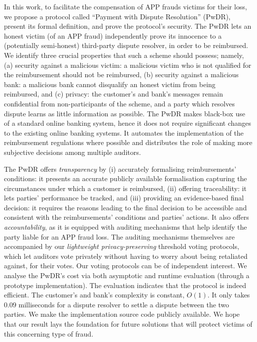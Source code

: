  In this work, to facilitate the compensation of   APP frauds victims for their loss, we propose a protocol called ``Payment with Dispute Resolution'' (PwDR), present its formal definition,  and prove the protocol's security.  The PwDR lets an honest victim (of an APP fraud)  independently prove its innocence to a  (potentially semi-honest) third-party dispute resolver, in order to be reimbursed.  We identify three crucial properties that such a scheme should possess; namely, (a) security against a malicious victim: a malicious victim who is not qualified for the reimbursement should not be reimbursed, (b) security against a malicious bank: a malicious bank cannot disqualify an honest victim from being reimbursed, and (c) privacy: the customer’s and bank’s messages remain confidential from non-participants of the scheme, and a party which resolves dispute learns as little information as possible.  The PwDR makes black-box use of a standard online banking system, hence it does not require significant changes to the existing online banking systems. %
%
   It automates the implementation of the reimbursement regulations where possible and distributes the role of making more subjective decisions among multiple auditors.


  The PwDR offers \emph{transparency} by (i) accurately formalising reimbursements' conditions: it presents an accurate publicly available formalisation capturing the circumstances under which a customer is reimbursed,  (ii) offering traceability:  it lets parties'  performance be tracked, and (iii) providing an evidence-based final decision: it requires the reasons leading to the final decision to be accessible and consistent with the reimbursements' conditions and parties' actions.  It also offers \emph{accountability}, as it is equipped with auditing mechanisms that help identify the party liable for an APP fraud loss.  The auditing mechanisms themselves are accompanied by our \emph{lightweight privacy-preserving} threshold voting protocols, which let auditors vote privately without having to worry about being retaliated against,  for their votes. Our voting protocols can be of independent interest.   We analyse the PwDR's cost via both asymptotic and runtime evaluation (through a prototype implementation). The evaluation indicates that the protocol is indeed efficient. The customer's and bank's complexity is constant, $O(1)$. It only takes $0.09$ milliseconds for a dispute resolver to settle a dispute between the two parties. We make the implementation source code publicly available. We hope that our result lays the foundation for future solutions that will protect victims of this concerning type of fraud. 

